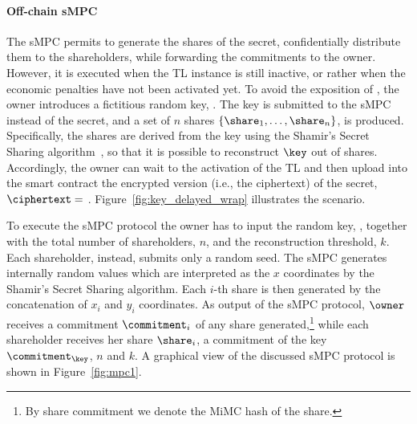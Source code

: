 \medskip

\paragraph*{Off-chain sMPC}\label{sect:impl_mpc_brief}
The sMPC permits to generate the shares of the secret, confidentially distribute them to the shareholders, while forwarding the commitments to the owner.
However, it is executed when the TL instance is still inactive, or rather when the economic penalties have not been activated yet. 
To avoid the exposition of \secret, the owner introduces a fictitious random key, \key.
The key is submitted to the sMPC instead of the secret, and a set of $n$ shares $\left\lbrace \share _1 , \ldots , \share_{n} 	\right\rbrace$, is produced.
Specifically, the shares are derived from the key using the Shamir's Secret Sharing algorithm~\cite{Shamir:1979:SS:359168.359176}, so that it is possible to reconstruct $\key$ out of \KofN shares.
Accordingly, the owner can wait to the activation of the TL and then upload into the smart contract the encrypted version (i.e., the ciphertext) of the secret, $\ciphertext = $ \wrapsecret. 
Figure~\ref{fig:key_delayed_wrap} illustrates the scenario.

To execute the sMPC protocol the owner has to input the random key, \key, together with the total number of shareholders, $n$, and the reconstruction threshold, $k$. 
Each shareholder, instead, submits only a random seed.
The sMPC generates internally random values which are interpreted as the $x$ coordinates by the Shamir's Secret Sharing algorithm.
Each $i$-th share is then generated by the concatenation of $x_i$ and $y_i$ coordinates.
As output of the sMPC protocol, $\owner$ receives a commitment $\commitment _i$ of any share generated,\footnote{By share commitment we denote the MiMC hash of the share.} while each shareholder receives her share $\share_{i}$, a commitment of the key $ \commitment _ \key $, $n$ and $k$.
A graphical view of the discussed sMPC protocol is shown in Figure~\ref{fig:mpc1}.


